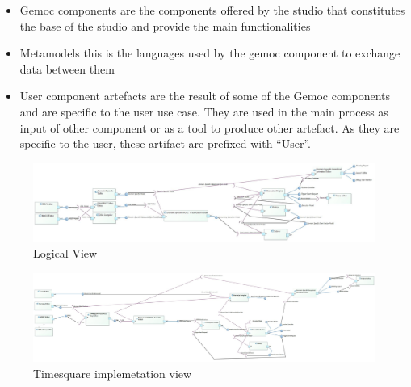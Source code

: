 \documentclass{gemoc} %
\begin{document}
\begin{itemize}
	\item Gemoc components are the components offered by the studio that constitutes the base of the studio and provide the main functionalities
	\item Metamodels this is the languages used by the gemoc component to exchange data between them
	\item User component artefacts are the result of some of the Gemoc components and are specific to the user use case. They are used in the main process as input of other component or as a tool to produce other artefact. As they are specific to the user, these artifact are prefixed with ``User''.
\end{itemize}

\begin{figure}[htp]
	\begin{center}
	\includegraphics*[trim=0.0cm 0.0cm 0cm 0.0cm, clip=true, angle=90, totalheight=0.9\textheight]{../images/Logical View.jpg}
	\caption{Logical View}
	\label{fig:LogicalView}
	\end{center}
\end{figure}
\begin{figure}[htp]
	\begin{center}
	\includegraphics*[trim=0.0cm 0.0cm 0cm 0.0cm, clip=true, angle=90, totalheight=0.9\textheight]{../images/TimesquareImplementation.jpg}
	\caption{Timesquare implemetation view}
	\label{fig:TimesquareImplementation}
	\end{center}
\end{figure}
\end{document}
